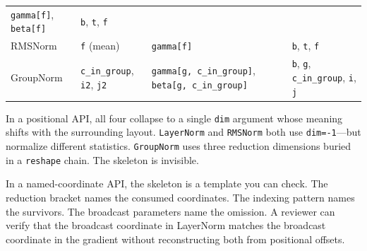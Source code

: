 \documentclass[11pt,]{article}
\begin{document}
\begin{longtable}[]{@{}llll@{}}
\begin{minipage}[t]{0.22\columnwidth}
\texttt{gamma{[}f{]}}, \texttt{beta{[}f{]}}\strut
\end{minipage} & \begin{minipage}[t]{0.22\columnwidth}\raggedright
\texttt{b}, \texttt{t}, \texttt{f}\strut
\end{minipage}\tabularnewline
\begin{minipage}[t]{0.22\columnwidth}\raggedright
RMSNorm\strut
\end{minipage} & \begin{minipage}[t]{0.22\columnwidth}\raggedright
\texttt{f} (mean)\strut
\end{minipage} & \begin{minipage}[t]{0.22\columnwidth}\raggedright
\texttt{gamma{[}f{]}}\strut
\end{minipage} & \begin{minipage}[t]{0.22\columnwidth}\raggedright
\texttt{b}, \texttt{t}, \texttt{f}\strut
\end{minipage}\tabularnewline
\begin{minipage}[t]{0.22\columnwidth}\raggedright
GroupNorm\strut
\end{minipage} & \begin{minipage}[t]{0.22\columnwidth}\raggedright
\texttt{c\_in\_group}, \texttt{i2}, \texttt{j2}\strut
\end{minipage} & \begin{minipage}[t]{0.22\columnwidth}\raggedright
\texttt{gamma{[}g,\ c\_in\_group{]}},
\texttt{beta{[}g,\ c\_in\_group{]}}\strut
\end{minipage} & \begin{minipage}[t]{0.22\columnwidth}\raggedright
\texttt{b}, \texttt{g}, \texttt{c\_in\_group}, \texttt{i},
\texttt{j}\strut
\end{minipage}\tabularnewline
\bottomrule
\end{longtable}

In a positional API, all four collapse to a single \texttt{dim} argument
whose meaning shifts with the surrounding layout. \texttt{LayerNorm} and
\texttt{RMSNorm} both use \texttt{dim=-1}---but normalize different
statistics. \texttt{GroupNorm} uses three reduction dimensions buried in
a \texttt{reshape} chain. The skeleton is invisible.

In a named-coordinate API, the skeleton is a template you can check. The
reduction bracket names the consumed coordinates. The indexing pattern
names the survivors. The broadcast parameters name the omission. A
reviewer can verify that the broadcast coordinate in LayerNorm matches
the broadcast coordinate in the gradient without reconstructing both
from positional offsets.
\end{document}
